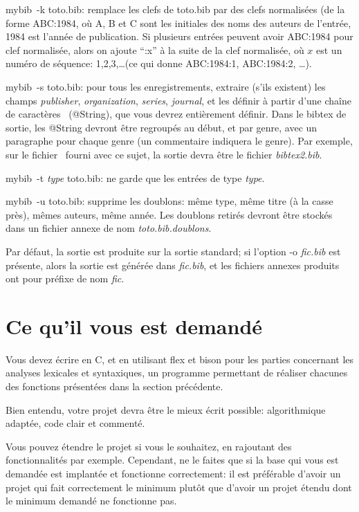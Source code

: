 \documentclass[10pt,a4wide,draft]{article}
\newcommand{\mybib}[0]{{mybib}\xspace}
\begin{document}
\mybib\ -k toto.bib: remplace les clefs de toto.bib par des clefs normalisées (de la forme ABC:1984, où A, B et C sont les initiales des noms des auteurs de l'entrée, 1984 est l'année de publication. Si plusieurs entrées peuvent avoir ABC:1984 pour clef normalisée, alors on ajoute ``:x'' à la suite de la clef normalisée, où $x$ est un numéro de séquence: 1,2,3,\dots (ce qui donne ABC:1984:1, ABC:1984:2, \dots).

\mybib\ -s toto.bib: pour tous les enregistrements, extraire (s'ils existent) les champs {\it publisher}, {\it organization}, {\it series}, {\it journal}, et les définir à partir d'une chaîne de caractères \BibTeX\ (@String), que vous devrez entièrement définir. Dans le bibtex de sortie, les @String devront être regroupés au début, et par genre, avec un paragraphe pour chaque genre (un commentaire indiquera le genre). Par exemple, sur le fichier \BibTeX\ fourni avec ce sujet, la sortie devra être le fichier {\it bibtex2.bib}.

\mybib\ -t {\it  type} toto.bib: ne garde que les entrées de type {\it type}.

\mybib\ -u toto.bib: supprime les doublons: même type, même titre (à la casse près), mêmes auteurs, même année. Les doublons retirés devront être stockés dans un fichier annexe de nom {\it toto.bib.doublons}.

\medskip

Par défaut, la sortie est produite sur la sortie standard; si l'option -o {\it fic.bib} est présente, alors la sortie est générée dans {\it fic.bib}, et les fichiers annexes produits ont pour préfixe de nom {\it fic}.

\section{Ce qu'il vous est demandé}

Vous devez écrire en C, et en utilisant flex et bison pour les parties concernant les analyses lexicales et syntaxiques, un programme permettant de réaliser chacunes des fonctions présentées dans la section précédente.

Bien entendu, votre projet devra être le mieux écrit possible: algorithmique adaptée, code clair et commenté.

Vous pouvez étendre le projet si vous le souhaitez, en rajoutant des fonctionnalités par exemple. Cependant, ne le faites que si la base qui vous est demandée est implantée et fonctionne correctement: il est préférable d'avoir un projet qui fait correctement le minimum plutôt que d'avoir un projet étendu dont le minimum demandé ne fonctionne pas.
\end{document}
